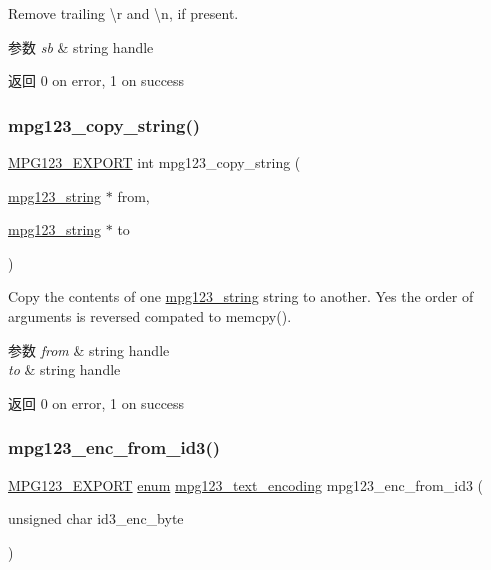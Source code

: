 Remove trailing \textbackslash{}r and \textbackslash{}n, if present. 
\begin{DoxyParams}{参数}
{\em sb} & string handle \\
\hline
\end{DoxyParams}
\begin{DoxyReturn}{返回}
0 on error, 1 on success 
\end{DoxyReturn}
\mbox{\label{group__mpg123__metadata_ga9d7fe63da5bc665bc754975b293e0a6b}} 
\subsubsection{\texorpdfstring{mpg123\+\_\+copy\+\_\+string()}{mpg123\_copy\_string()}}
{\footnotesize\ttfamily \hyperlink{mpg123_8h_a2ba98cfba3f760879df70e755b2a61cc}{M\+P\+G123\+\_\+\+E\+X\+P\+O\+RT} int mpg123\+\_\+copy\+\_\+string (\begin{DoxyParamCaption}\item[{\hyperlink{structmpg123__string}{mpg123\+\_\+string} $\ast$}]{from,  }\item[{\hyperlink{structmpg123__string}{mpg123\+\_\+string} $\ast$}]{to }\end{DoxyParamCaption})}

Copy the contents of one \hyperlink{structmpg123__string}{mpg123\+\_\+string} string to another. Yes the order of arguments is reversed compated to memcpy(). 
\begin{DoxyParams}{参数}
{\em from} & string handle \\
\hline
{\em to} & string handle \\
\hline
\end{DoxyParams}
\begin{DoxyReturn}{返回}
0 on error, 1 on success 
\end{DoxyReturn}
\mbox{\label{group__mpg123__metadata_gabd394947d8cca46e49a0e07926bb2369}} 
\subsubsection{\texorpdfstring{mpg123\+\_\+enc\+\_\+from\+\_\+id3()}{mpg123\_enc\_from\_id3()}}
{\footnotesize\ttfamily \hyperlink{mpg123_8h_a2ba98cfba3f760879df70e755b2a61cc}{M\+P\+G123\+\_\+\+E\+X\+P\+O\+RT} \hyperlink{interfaceenum}{enum} \hyperlink{group__mpg123__metadata_ga489b4cd5fb8d1d826e38b09bed9294ce}{mpg123\+\_\+text\+\_\+encoding} mpg123\+\_\+enc\+\_\+from\+\_\+id3 (\begin{DoxyParamCaption}\item[{unsigned char}]{id3\+\_\+enc\+\_\+byte }\end{DoxyParamCaption})}

